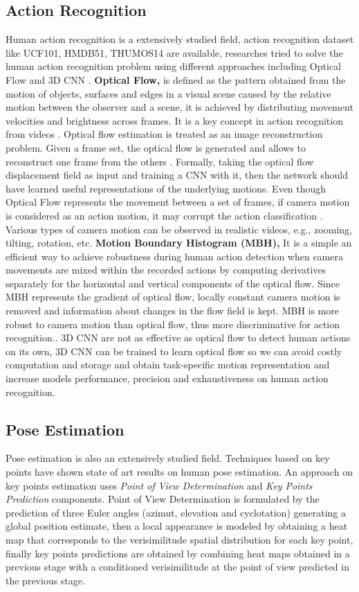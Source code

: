 \documentclass[twocolumn,conference]{article}
\begin{document}
\subsection{Action Recognition}
Human action recognition is a extensively studied field, action recognition dataset like UCF101, HMDB51, THUMOS14  are available, researches tried to solve the human action recognition problem using different approaches including Optical Flow and 3D CNN \cite{qiu2017learning}.  \textbf{Optical Flow,} is defined as the pattern obtained from the motion of objects, surfaces and edges in a visual scene caused by the relative motion between the observer and a scene, it is achieved by distributing movement velocities and brightness across frames. It is a  key concept in action recognition from videos \cite{wang2019hallucinating}. Optical flow estimation is treated as an image reconstruction problem. Given a frame set, the optical flow is generated and allows to reconstruct one frame from the others \cite{zhu2018hidden}. Formally, taking the optical flow displacement field as input and training a CNN with it, then the network should have learned useful representations of the underlying motions. Even though Optical Flow represents the movement between a set of frames, if camera motion is considered as an action motion, it may corrupt the action classification \cite{wang2013dense}. Various types of camera motion can be observed in realistic videos, e.g., zooming, tilting, rotation, etc. \textbf{Motion Boundary Histogram (MBH),} It is a simple an efficient way to achieve robustness during human action detection when camera movements are mixed within the recorded actions by computing derivatives separately for the horizontal and vertical components of the optical flow. Since MBH represents the gradient of optical flow, locally constant camera motion is removed and information about changes in the flow field is kept. MBH is more robust to camera motion than optical flow, thus more discriminative for action recognition.\cite{wang2013dense}. 3D CNN are not as effective as optical flow to detect human actions on its own, 3D CNN can be trained to learn optical flow so we can avoid costly computation and storage and obtain task-specific motion representation  \cite{zhu2018hidden} and increase models performance, precision and exhaustiveness on human action recognition.
\subsection{Pose Estimation}
Pose estimation is also an extensively studied field. Techniques based on key points have shown state of art results on human pose estimation. An approach on key points estimation \cite{tulsianiMalik} uses \textit{Point of View Determination} and \textit{Key Points Prediction} components. Point of View Determination is formulated by the prediction of three Euler angles (azimut, elevation and cyclotation) generating a global position estimate, then a local appearance is modeled by obtaining a heat map that corresponds to the verisimilitude spatial distribution for each key point, finally key points predictions are obtained by combining heat maps obtained in a previous stage with a conditioned verisimilitude at the point of view predicted in the previous stage.
\end{document}
